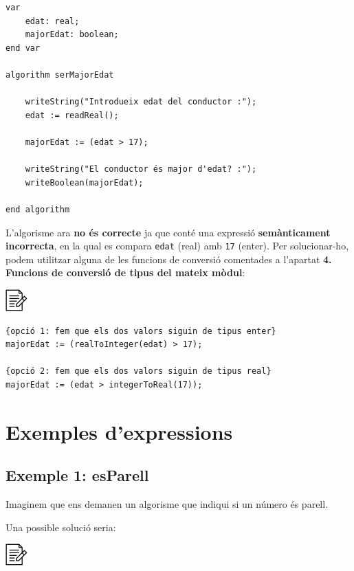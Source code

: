 \documentclass[]{book}
\begin{document}
\begin{verbatim}
var
    edat: real;
    majorEdat: boolean;
end var

algorithm serMajorEdat

    writeString("Introdueix edat del conductor :");
    edat := readReal();

    majorEdat := (edat > 17);

    writeString("El conductor és major d'edat? :");
    writeBoolean(majorEdat);

end algorithm
\end{verbatim}

L'algorisme ara \textbf{no és correcte} ja que conté una expressió \textbf{semànticament incorrecta}, en la qual es compara \texttt{edat} (real) amb \texttt{17} (enter). Per solucionar-ho, podem utilitzar alguna de les funcions de conversió comentades a l'apartat \textbf{4. Funcions de conversió de tipus del mateix mòdul}:

\includegraphics{./img/alg.png}

\begin{verbatim}
{opció 1: fem que els dos valors siguin de tipus enter}
majorEdat := (realToInteger(edat) > 17);    

{opció 2: fem que els dos valors siguin de tipus real}
majorEdat := (edat > integerToReal(17));
\end{verbatim}

\hypertarget{exemples-dexpressions}{%
\section{Exemples d'expressions}\label{exemples-dexpressions}}

\hypertarget{exemple-1-esparell}{%
\subsection{Exemple 1: esParell}\label{exemple-1-esparell}}

Imaginem que ens demanen un algorisme que indiqui si un número és parell.

Una possible solució seria:

\includegraphics{./img/alg.png}
\end{document}
